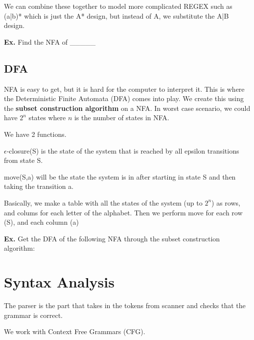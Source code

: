 \documentclass[12pt,letterpaper]{article} \usepackage{amsmath} \usepackage{graphicx} \usepackage[margin=1in]{geometry} \usepackage{longtable}  \usepackage{amssymb}
\begin{document}
	We can combine these together to model more complicated REGEX such as (a|b)* which is just the A* design, but instead of A, we substitute the A|B design.
	
	\begin{mdframed}
		\textbf{Ex. } Find the NFA of \_\_\_\_\_
	\end{mdframed}
	
	\subsection{DFA}
	NFA is easy to get, but it is hard for the computer to interpret it. This is where the Deterministic Finite Automata (DFA) comes into play. We create this using the \textbf{subset construction algorithm} on a NFA. In worst case scenario, we could have $2^n$ states where $n$ is the number of states in NFA.
	
	We have 2 functions.
	
	$\epsilon$-closure(S) is the state of the system that is reached by all epsilon transitions from state S. 
	
	move(S,a) will be the state the system is in after starting in state S and then taking the transition a.
	
	Basically, we make a table with all the states of the system (up to $2^n$) as rows, and colums for each letter of the alphabet. Then we perform move for each row (S), and each column (a)
	
	\begin{mdframed}
		\textbf{Ex. } Get the DFA of the following NFA through the subset construction algorithm:
	\end{mdframed}
	
	\section{Syntax Analysis}
	The parser is the part that takes in the tokens from scanner and checks that the grammar is correct. 
	
	We work with Context Free Grammars (CFG). 
	
\end{document}
